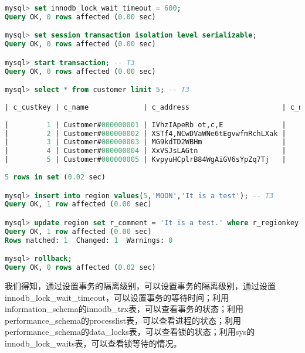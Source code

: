\documentclass{article}
\begin{document}
\begin{lstlisting}[language=sql]
mysql> set innodb_lock_wait_timeout = 600;
Query OK, 0 rows affected (0.00 sec)

mysql> set session transaction isolation level serializable;
Query OK, 0 rows affected (0.00 sec)

mysql> start transaction; -- T3
Query OK, 0 rows affected (0.00 sec)

mysql> select * from customer limit 5; -- T3
    
| c_custkey | c_name             | c_address                      | c_nationkey | c_phone         | c_acctbal | c_mktsegment | c_comment
    
|         1 | Customer#000000001 | IVhzIApeRb ot,c,E              |          15 | 25-989-741-2988 |    711.56 | BUILDING     | to the even, regular platelets. regular, ironic epitaphs nag e                                         |
|         2 | Customer#000000002 | XSTf4,NCwDVaWNe6tEgvwfmRchLXak |          13 | 23-768-687-3665 |    121.65 | AUTOMOBILE   | l accounts. blithely ironic theodolites integrate boldly: caref                                        |
|         3 | Customer#000000003 | MG9kdTD2WBHm                   |           1 | 11-719-748-3364 |   7498.12 | AUTOMOBILE   |  deposits eat slyly ironic, even instructions. express foxes detect slyly. blithely even accounts abov |
|         4 | Customer#000000004 | XxVSJsLAGtn                    |           4 | 14-128-190-5944 |   2866.83 | MACHINERY    |  requests. final, regular ideas sleep final accou                                                      |
|         5 | Customer#000000005 | KvpyuHCplrB84WgAiGV6sYpZq7Tj   |           3 | 13-750-942-6364 |    794.47 | HOUSEHOLD    | n accounts will have to unwind. foxes cajole accor                                                     |
    
5 rows in set (0.02 sec)

mysql> insert into region values(5,'MOON','It is a test'); -- T3
Query OK, 1 row affected (0.00 sec)

mysql> update region set r_comment = 'It is a test.' where r_regionkey = 0; -- T3
Query OK, 1 row affected (0.00 sec)
Rows matched: 1  Changed: 1  Warnings: 0

mysql> rollback;
Query OK, 0 rows affected (0.02 sec)
\end{lstlisting}

我们得知，通过设置事务的隔离级别，可以设置事务的隔离级别，通过设置innodb\_lock\_wait\_timeout，可以设置事务的等待时间；利用information\_schema的innodb\_trx表，可以查看事务的状态；利用performance\_schema的processlist表，可以查看进程的状态；利用performance\_schema的data\_locks表，可以查看锁的状态；利用sys的innodb\_lock\_waits表，可以查看锁等待的情况。
\end{document}
